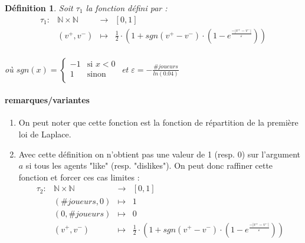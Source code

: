 \documentclass[12pt]{article}
\theoremstyle{defi}
\newtheorem{definition}{Définition}[section]
\theoremstyle{not}
\theoremstyle{prob}
\begin{document}
      \begin{definition}
        \label{ref:def_tau}
        Soit $\tau_1$ la fonction défini par :
        $$
          \begin{array}{rclc}
            \tau_1 :  & \mathbb{N} \times \mathbb{N} & \longrightarrow & [0, 1] \\
            & (v^+,v^-) & \longmapsto & \frac{1}{2} \cdot \left(1 + sgn(v^+ - v^-) \cdot \left(1 - e^{\frac{-|v^+ - v^-|}{\varepsilon}}\right)\right)\\
          \end{array}
        $$

        où
        $sgn(x) = \left\{
          \begin{array}{ll}
            -1  & \mbox{si } x < 0 \\
            1 & \mbox{sinon} \\
          \end{array}
        \right.$
        et $\varepsilon = - \frac{\#joueurs}{ln(0.04)}$
      \end{definition}

      \paragraph{remarques/variantes}
      \label{ref:rem_def_tau}
        \begin{enumerate}
          \item On peut noter que cette fonction est la fonction de répartition de la première loi de Laplace.
          \item Avec cette définition on n'obtient pas une valeur de 1 (resp. $0$) sur l'argument $a$ si tous les agents "like" (resp. "dislikes"). On peut donc raffiner cette fonction et forcer ces cas limites :
            $$
              \begin{array}{rclc}
                \tau_2 :  & \mathbb{N} \times \mathbb{N} & \longrightarrow & [0, 1] \\
                & (\#joueurs, 0) & \longmapsto & 1 \\
                & (0, \#joueurs) & \longmapsto & 0 \\
                & (v^+,v^-) & \longmapsto & \frac{1}{2} \cdot \left(1 + sgn(v^+ - v^-) \cdot \left(1 - e^{\frac{-|v^+ - v^-|}{\varepsilon}}\right)\right)\\
              \end{array}
            $$\\
        \end{enumerate}
\end{document}
